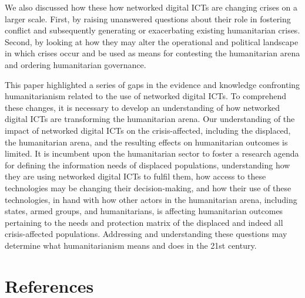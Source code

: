 We also discussed how these how networked digital ICTs are changing
crises on a larger scale. First, by raising unanswered questions about
their role in fostering conflict and subsequently generating or
exacerbating existing humanitarian crises. Second, by looking at how
they may alter the operational and political landscape in which crises
occur and be used as means for contesting the humanitarian arena and
ordering humanitarian governance.

This paper highlighted a series of gaps in the evidence and knowledge
confronting humanitarianism related to the use of networked digital
ICTs. To comprehend these changes, it is necessary to develop an
understanding of how networked digital ICTs are transforming the
humanitarian arena. Our understanding of the impact of networked digital
ICTs on the crisis-affected, including the displaced, the humanitarian
arena, and the resulting effects on humanitarian outcomes is limited. It
is incumbent upon the humanitarian sector to foster a research agenda
for defining the information needs of displaced populations,
understanding how they are using networked digital ICTs to fulfil them,
how access to these technologies may be changing their decision-making,
and how their use of these technologies, in hand with how other actors
in the humanitarian arena, including states, armed groups, and
humanitarians, is affecting humanitarian outcomes pertaining to the
needs and protection matrix of the displaced and indeed all
crisis-affected populations. Addressing and understanding these
questions may determine what humanitarianism means and does in the 21st
century.

\hypertarget{references}{%
\section*{References}\label{references}}

